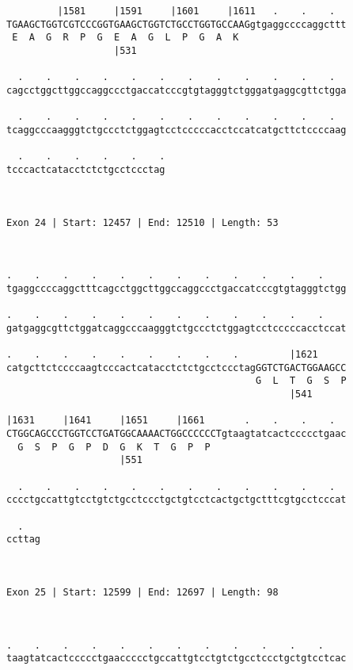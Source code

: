 \documentclass{article}
\begin{document}
\begin{Verbatim}
         |1581     |1591     |1601     |1611   .    .    .  
TGAAGCTGGTCGTCCCGGTGAAGCTGGTCTGCCTGGTGCCAAGgtgaggccccaggcttt
 E  A  G  R  P  G  E  A  G  L  P  G  A  K                   
                   |531                                     
  
  .    .    .    .    .    .    .    .    .    .    .    .  
cagcctggcttggccaggccctgaccatcccgtgtagggtctgggatgaggcgttctgga
                                                            
  .    .    .    .    .    .    .    .    .    .    .    .  
tcaggcccaagggtctgccctctggagtcctcccccacctccatcatgcttctccccaag
                                                            
  .    .    .    .    .    .
tcccactcatacctctctgcctccctag
                            
                            
 
Exon 24 | Start: 12457 | End: 12510 | Length: 53



.    .    .    .    .    .    .    .    .    .    .    .    
tgaggccccaggctttcagcctggcttggccaggccctgaccatcccgtgtagggtctgg
                                                            
.    .    .    .    .    .    .    .    .    .    .    .    
gatgaggcgttctggatcaggcccaagggtctgccctctggagtcctcccccacctccat
                                                            
.    .    .    .    .    .    .    .    .         |1621     
catgcttctccccaagtcccactcatacctctctgcctccctagGGTCTGACTGGAAGCC
                                            G  L  T  G  S  P
                                                  |541      
  
|1631     |1641     |1651     |1661       .    .    .    .  
CTGGCAGCCCTGGTCCTGATGGCAAAACTGGCCCCCCTgtaagtatcactccccctgaac
  G  S  P  G  P  D  G  K  T  G  P  P                        
                    |551                                    
  
  .    .    .    .    .    .    .    .    .    .    .    .  
cccctgccattgtcctgtctgcctccctgctgtcctcactgctgctttcgtgcctcccat
                                                            
  .   
ccttag
      
      
 
Exon 25 | Start: 12599 | End: 12697 | Length: 98



.    .    .    .    .    .    .    .    .    .    .    .    
taagtatcactccccctgaaccccctgccattgtcctgtctgcctccctgctgtcctcac
                                                            

\end{Verbatim}
\end{document}
